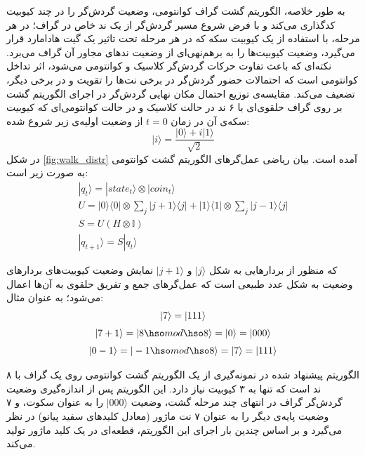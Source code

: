 به طور خلاصه، الگوریتم گشت گراف کوانتومی، وضعیت گردش‌گر را در چند کیوبیت کدگذاری می‌کند و با فرض شروع مسیر گردش‌گر از یک ند خاص در گراف؛ در هر مرحله، با استفاده از یک کیوبیت سکه
که در هر مرحله تحت تاثیر یک گیت هادامارد قرار می‌گیرد، وضعیت کیوبیت‌ها را به برهم‌نهی‌ای از وضعیت ندهای مجاور آن گراف می‌برد. نکته‌ای که باعث تفاوت حرکات گردش‌گر کلاسیک و کوانتومی می‌شود، اثر تداخل کوانتومی
است که احتمالات حضور گردش‌گر در برخی نت‌ها را تقویت و در برخی دیگر، تضعیف می‌کند.
مقایسه‌ی توزیع احتمال مکان نهایی گردش‌گر در اجرای الگوریتم گشت بر روی گراف حلقوی‌ای با ۶ ند در حالت کلاسیک و در حالت کوانتومی‌ای که کیوبیت سکه‌ی آن در زمان
$t=0$
از وضعیت اولیه‌ی زیر شروع شده:
\begin{equation}
    |i\rangle = \frac{|0\rangle + i|1\rangle}{\sqrt{2}}
\end{equation}
در شکل
\ref{fig:walk_distr}
آمده است.
بیان ریاضی عمل‌گرهای الگوریتم گشت کوانتومی به صورت زیر است:
\begin{equation}
\begin{gathered}
    |q_t\rangle = |state_t\rangle \otimes |coin_t\rangle \\[3pt]
    U = |0\rangle \langle 0| \otimes \sum_j |j + 1\rangle \langle j| + |1\rangle \langle 1| \otimes \sum_j |j - 1\rangle
    \langle j| \\[3pt]
    S = U(H \otimes \mathbb{I}) \\[3pt]
    |q_{t+1}\rangle = S|q_t \rangle
\end{gathered}
\end{equation}

که منظور از بردارهایی به شکل
$|j\rangle$
و 
$|j+1\rangle$
نمایش وضعیت کیوبیت‌های بردارهای وضعیت به شکل عدد طبیعی است که عمل‌گرهای جمع و تفریق حلقوی به آن‌ها اعمال می‌شود؛ به عنوان مثال:
\begin{equation}
    \begin{gathered}
        |7\rangle = |111\rangle \\[3pt]
        |7 + 1\rangle = |8 \hso mod \hso 8\rangle = |0\rangle = |000\rangle \\[3pt]
        |0 - 1\rangle = |-1 \hso mod \hso 8\rangle = |7\rangle = |111\rangle
    \end{gathered}
\end{equation}

الگوریتم پیشنهاد شده در 
\cite{miranda}
نمونه‌گیری از یک الگوریتم گشت کوانتومی روی یک گراف با ۸ ند است که تنها به ۳ کیوبیت نیاز دارد. این الگوریتم پس از اندازه‌گیری وضعیت گردش‌گر گراف در انتهای چند مرحله گشت، وضعیت
$|000\rangle$
را به عنوان سکوت، و ۷ وضعیت پایه‌ی دیگر را به عنوان ۷ نت ماژور (معادل کلیدهای سفید پیانو) در نظر می‌گیرد و بر اساس چندین بار اجرای این الگوریتم، قطعه‌ای در یک کلید ماژور تولید می‌کند.